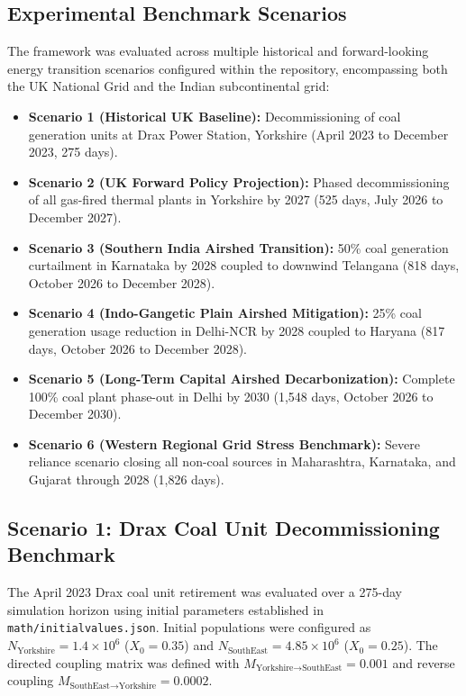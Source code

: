 \documentclass[conference]{IEEEtran}
\renewcommand{\_}{\textunderscore\allowbreak{}}%
\begin{document}
\subsection{Experimental Benchmark Scenarios}
The framework was evaluated across multiple historical and forward-looking energy transition scenarios configured within the repository, encompassing both the UK National Grid and the Indian subcontinental grid:
\begin{itemize}
    \item \textbf{Scenario 1 (Historical UK Baseline):} Decommissioning of coal generation units at Drax Power Station, Yorkshire (April 2023 to December 2023, 275 days).
    \item \textbf{Scenario 2 (UK Forward Policy Projection):} Phased decommissioning of all gas-fired thermal plants in Yorkshire by 2027 (525 days, July 2026 to December 2027).
    \item \textbf{Scenario 3 (Southern India Airshed Transition):} 50\% coal generation curtailment in Karnataka by 2028 coupled to downwind Telangana (818 days, October 2026 to December 2028).
    \item \textbf{Scenario 4 (Indo-Gangetic Plain Airshed Mitigation):} 25\% coal generation usage reduction in Delhi-NCR by 2028 coupled to Haryana (817 days, October 2026 to December 2028).
    \item \textbf{Scenario 5 (Long-Term Capital Airshed Decarbonization):} Complete 100\% coal plant phase-out in Delhi by 2030 (1,548 days, October 2026 to December 2030).
    \item \textbf{Scenario 6 (Western Regional Grid Stress Benchmark):} Severe reliance scenario closing all non-coal sources in Maharashtra, Karnataka, and Gujarat through 2028 (1,826 days).
\end{itemize}

\subsection{Scenario 1: Drax Coal Unit Decommissioning Benchmark}
The April 2023 Drax coal unit retirement was evaluated over a 275-day simulation horizon using initial parameters established in \texttt{math/initial\_values.json}. Initial populations were configured as $N_{\text{Yorkshire}} = 1.4\times 10^6$ ($X_0 = 0.35$) and $N_{\text{SouthEast}} = 4.85\times 10^6$ ($X_0 = 0.25$). The directed coupling matrix was defined with $M_{\text{Yorkshire}\to\text{SouthEast}} = 0.001$ and reverse coupling $M_{\text{SouthEast}\to\text{Yorkshire}} = 0.0002$.
\end{document}
